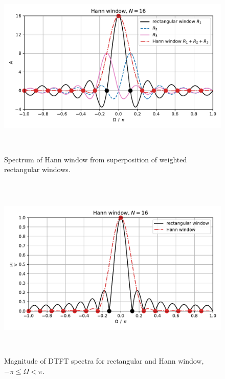 \documentclass[11pt,a4paper,DIV=12]{scrartcl}
\begin{document}
\begin{figure}
		\centering
		\includegraphics[width=6in, height=3.5in]{graphics/Hann_from_RectWindow.pdf}
		\caption{Spectrum of Hann window from superposition of weighted rectangular windows.}
		\label{HanningausRectWindow}
\end{figure}
\begin{figure}
		\centering
		\includegraphics[width=6in, height=3.5in]{graphics/DTFTHannWin_lin.pdf}
		\caption{Magnitude of DTFT spectra for rectangular and Hann window, $-\pi\leq\Omega<\pi$.}
		\label{DTFTHanningWin_lin}
\end{figure}
\end{document}
